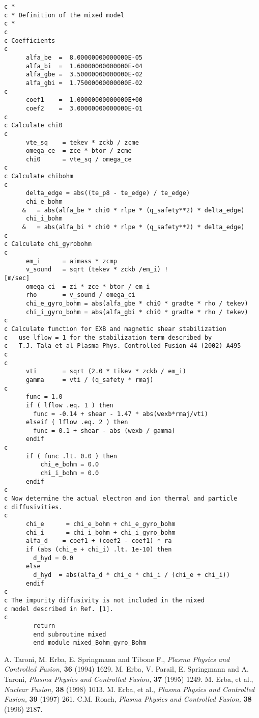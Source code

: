 \begin{verbatim}
c *
c * Definition of the mixed model
c *
c
c Coefficients
c
      alfa_be  =  8.00000000000000E-05
      alfa_bi  =  1.60000000000000E-04
      alfa_gbe =  3.50000000000000E-02
      alfa_gbi =  1.75000000000000E-02
c
      coef1    =  1.00000000000000E+00
      coef2    =  3.00000000000000E-01
c
c Calculate chi0
c
      vte_sq    = tekev * zckb / zcme
      omega_ce  = zce * btor / zcme
      chi0      = vte_sq / omega_ce
c
c Calculate chibohm
c
      delta_edge = abs((te_p8 - te_edge) / te_edge)
      chi_e_bohm
     &   = abs(alfa_be * chi0 * rlpe * (q_safety**2) * delta_edge)
      chi_i_bohm
     &   = abs(alfa_bi * chi0 * rlpe * (q_safety**2) * delta_edge)
c
c Calculate chi_gyrobohm
c
      em_i      = aimass * zcmp
      v_sound   = sqrt (tekev * zckb /em_i) !                   [m/sec]
      omega_ci  = zi * zce * btor / em_i
      rho       = v_sound / omega_ci
      chi_e_gyro_bohm = abs(alfa_gbe * chi0 * gradte * rho / tekev)
      chi_i_gyro_bohm = abs(alfa_gbi * chi0 * gradte * rho / tekev)
c
c Calculate function for EXB and magnetic shear stabilization
c   use lflow = 1 for the stabilization term described by
c   T.J. Tala et al Plasma Phys. Controlled Fusion 44 (2002) A495
c
c
      vti       = sqrt (2.0 * tikev * zckb / em_i)
      gamma     = vti / (q_safety * rmaj)
c
      func = 1.0
      if ( lflow .eq. 1 ) then
        func = -0.14 + shear - 1.47 * abs(wexb*rmaj/vti)
      elseif ( lflow .eq. 2 ) then
        func = 0.1 + shear - abs (wexb / gamma)
      endif
c
      if ( func .lt. 0.0 ) then
          chi_e_bohm = 0.0
          chi_i_bohm = 0.0
      endif
c
c Now determine the actual electron and ion thermal and particle
c diffusivities.
c
      chi_e      = chi_e_bohm + chi_e_gyro_bohm
      chi_i      = chi_i_bohm + chi_i_gyro_bohm
      alfa_d    = coef1 + (coef2 - coef1) * ra
      if (abs (chi_e + chi_i) .lt. 1e-10) then
        d_hyd = 0.0
      else
        d_hyd  = abs(alfa_d * chi_e * chi_i / (chi_e + chi_i))
      endif
c
c The impurity diffusivity is not included in the mixed
c model described in Ref. [1].
c
        return
        end subroutine mixed
        end module mixed_Bohm_gyro_Bohm
\end{verbatim}


\begin{thebibliography}{99}
A. Taroni, M. Erba, E. Springmann and Tibone F.,
{\em Plasma Physics and Controlled Fusion,} {\bf 36} (1994) 1629.
M. Erba, V. Parail, E. Springmann and A. Taroni,
{\em Plasma Physics and Controlled Fusion,} {\bf 37} (1995) 1249.
M. Erba, et al.,
{\em Nuclear Fusion,} {\bf 38} (1998) 1013.
M. Erba, et al.,
{\em Plasma Physics and Controlled Fusion,} {\bf 39} (1997) 261.
C.M. Roach,
{\em Plasma Physics and Controlled Fusion,} {\bf 38} (1996) 2187.
\end{thebibliography}


